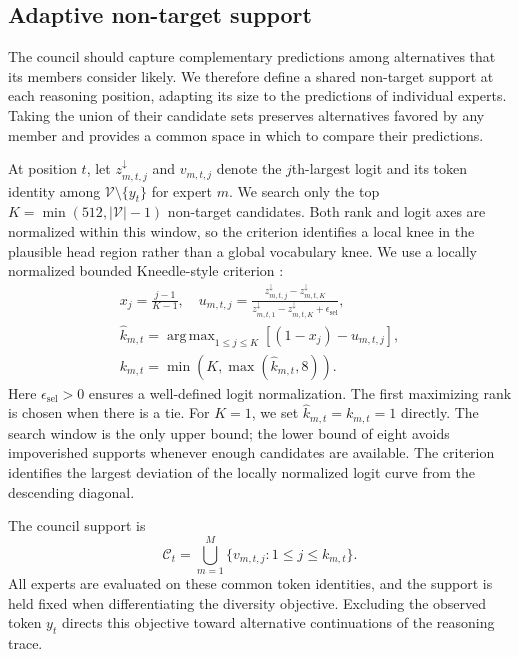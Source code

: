 \documentclass[11pt,twocolumn]{article}
\newcommand{\Vocab}{\mathcal{V}}
\newcommand{\Ccal}{\mathcal{C}}
\DeclareMathOperator*{\argmax}{arg\,max}
\begin{document}
\setcounter{section}{3}
\setcounter{subsection}{1}

\subsection{Adaptive non-target support}
\label{sec:council}

The council should capture complementary predictions among alternatives that
its members consider likely. We therefore define a shared non-target support
at each reasoning position, adapting its size to the predictions of individual
experts. Taking the union of their candidate sets preserves alternatives
favored by any member and provides a common space in which to compare their
predictions.

At position $t$, let $z^{\downarrow}_{m,t,j}$ and $v_{m,t,j}$ denote the
$j$th-largest logit and its token identity among
$\Vocab\setminus\{y_t\}$ for expert $m$. We search only the top
$K=\min(512,|\Vocab|-1)$ non-target candidates. Both rank and logit axes
are normalized within this window, so the criterion identifies a local knee
in the plausible head region rather than a global vocabulary knee. We use
a locally normalized bounded Kneedle-style criterion
\citep{satopaa2011kneedle}:
\begin{equation}
\begin{gathered}
 x_j=\frac{j-1}{K-1},\quad
 u_{m,t,j}=\frac{z^{\downarrow}_{m,t,j}-z^{\downarrow}_{m,t,K}}
 {z^{\downarrow}_{m,t,1}-z^{\downarrow}_{m,t,K}+\epsilon_{\mathrm{sel}}},\\
 \widehat k_{m,t}=\argmax_{1\le j\le K}
       \left[(1-x_j)-u_{m,t,j}\right],\\
 k_{m,t}=\min\!\left(K,\max(\widehat k_{m,t},8)\right).
\end{gathered}
\label{eq:kneedle}
\end{equation}
Here $\epsilon_{\mathrm{sel}}>0$ ensures a well-defined logit normalization.
The first maximizing rank is chosen when there is a tie. For $K=1$, we set
$\widehat k_{m,t}=k_{m,t}=1$ directly. The search window is the only upper
bound; the lower bound of eight avoids impoverished supports whenever enough
candidates are available. The criterion identifies the largest deviation of
the locally normalized logit curve from the descending diagonal.

The council support is
\begin{equation}
 \Ccal_t=\bigcup_{m=1}^{M}
              \{v_{m,t,j}:1\le j\le k_{m,t}\}.
 \label{eq:stage1-support}
\end{equation}
All experts are evaluated on these common token identities, and the support
is held fixed when differentiating the diversity objective. Excluding the
observed token $y_t$ directs this objective toward alternative continuations
of the reasoning trace.
\end{document}
